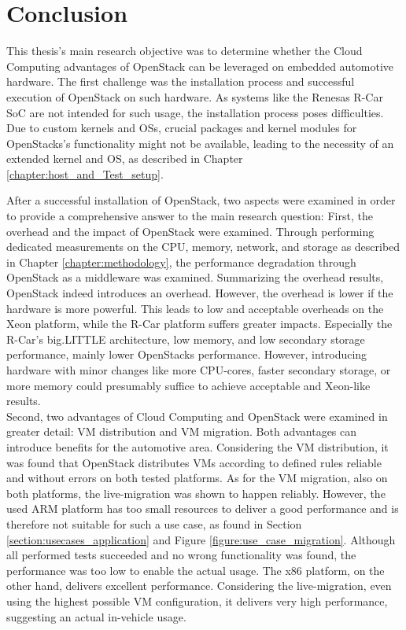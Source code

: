 \chapter{Conclusion}
\label{chapter:conclusion}
    
    This thesis's main research objective was to determine whether the Cloud Computing advantages of OpenStack can be leveraged on embedded automotive hardware.
    The first challenge was the installation process and successful execution of OpenStack on such hardware.
    As systems like the Renesas R-Car \ac{SoC} are not intended for such usage, the installation process poses difficulties.
    Due to custom kernels and \acp{OS}, crucial packages and kernel modules for OpenStacks's functionality might not be available, leading to the necessity of an extended kernel and \ac{OS}, as described in Chapter \ref{chapter:host_and_Test_setup}.
    
    
    \noindent After a successful installation of OpenStack, two aspects were examined in order to provide a comprehensive answer to the main research question:
    First, the overhead and the impact of OpenStack were examined.
    Through performing dedicated measurements on the \ac{CPU}, memory, network, and storage as described in Chapter \ref{chapter:methodology}, the performance degradation through OpenStack as a middleware was examined.
    Summarizing the overhead results, OpenStack indeed introduces an overhead.
    However, the overhead is lower if the hardware is more powerful.
    This leads to low and acceptable overheads on the Xeon platform, while the R-Car platform suffers greater impacts.
    Especially the R-Car's big.LITTLE architecture, low memory, and low secondary storage performance, mainly lower OpenStacks performance.
    However, introducing hardware with minor changes like more \ac{CPU}-cores, faster secondary storage, or more memory could presumably suffice to achieve acceptable and Xeon-like results.\\
    Second, two advantages of Cloud Computing and OpenStack were examined in greater detail: VM distribution and VM migration.
    Both advantages can introduce benefits for the automotive area.
    Considering the VM distribution, it was found that OpenStack distributes VMs according to defined rules reliable and without errors on both tested platforms.
    As for the VM migration, also on both platforms, the live-migration was shown to happen reliably.
    However, the used ARM platform has too small resources to deliver a good performance and is therefore not suitable for such a use case, as found in Section \ref{section:usecases_application} and Figure \ref{figure:use_case_migration}.
    Although all performed tests succeeded and no wrong functionality was found, the performance was too low to enable the actual usage.
    The x86 platform, on the other hand, delivers excellent performance.
    Considering the live-migration, even using the highest possible VM configuration, it delivers very high performance, suggesting an actual in-vehicle usage.
    
